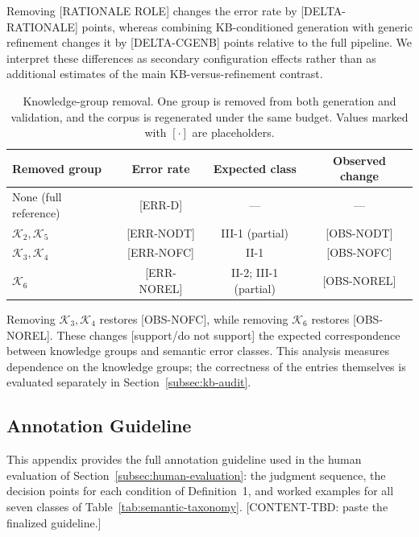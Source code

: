 \documentclass[letterpaper,journal]{IEEEtran}
\begin{document}
Removing [RATIONALE ROLE] changes the error rate by [DELTA-RATIONALE] points, whereas combining KB-conditioned generation with generic refinement changes it by [DELTA-CGENB] points relative to the full pipeline. We interpret these differences as secondary configuration effects rather than as additional estimates of the main KB-versus-refinement contrast.

\begin{table}[!t]
\centering
\caption{Knowledge-group removal. One group is removed from both generation and validation, and the corpus is regenerated under the same budget. Values marked with $[\cdot]$ are placeholders.}
\label{tab:knowledge-split}
\small
\setlength{\tabcolsep}{4pt}
\renewcommand{\arraystretch}{1.15}
\begin{tabular}{lccc}
\toprule
\textbf{Removed group} & \textbf{Error rate} & \textbf{Expected class} & \textbf{Observed change} \\
\midrule
None (full reference) & [ERR-D] & --- & --- \\
$\mathcal{K}_2,\mathcal{K}_5$ & [ERR-NODT] & III-1 (partial) & [OBS-NODT] \\
$\mathcal{K}_3,\mathcal{K}_4$ & [ERR-NOFC] & II-1 & [OBS-NOFC] \\
$\mathcal{K}_6$ & [ERR-NOREL] & II-2; III-1 (partial) & [OBS-NOREL] \\
\bottomrule
\end{tabular}
\end{table}

Removing $\mathcal{K}_3,\mathcal{K}_4$ restores [OBS-NOFC], while removing $\mathcal{K}_6$ restores [OBS-NOREL]. These changes [support/do not support] the expected correspondence between knowledge groups and semantic error classes. This analysis measures dependence on the knowledge groups; the correctness of the entries themselves is evaluated separately in Section~\ref{subsec:kb-audit}.

\clearpage


\subsection{Annotation Guideline}
\label{app:annotation-guideline}

This appendix provides the full annotation guideline used in the human evaluation of Section~\ref{subsec:human-evaluation}: the judgment sequence, the decision points for each condition of Definition~1, and worked examples for all seven classes of Table~\ref{tab:semantic-taxonomy}. [CONTENT-TBD: paste the finalized guideline.]
\end{document}
